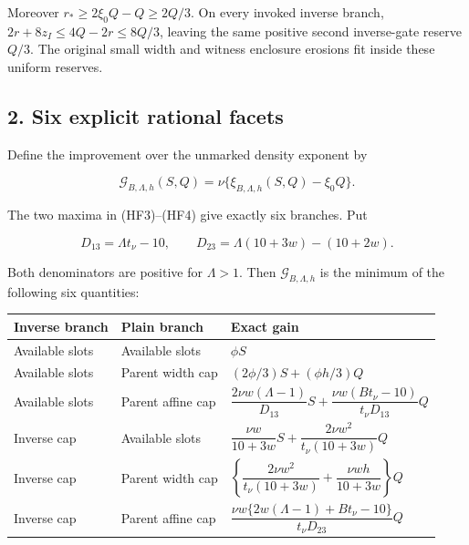 Moreover \(r_*\ge2\xi_0Q-Q\ge2Q/3\). On every invoked inverse branch, \(2r+8z_I\le4Q-2r\le8Q/3\), leaving the same positive second inverse-gate reserve \(Q/3\). The original small width and witness enclosure erosions fit inside these uniform reserves.

\hypertarget{feedback:six-explicit-rational-facets}{%
\subsection{2. Six explicit rational facets}\label{feedback:six-explicit-rational-facets}}

Define the improvement over the unmarked density exponent by

\[
 \mathcal G_{B,\Lambda,h}(S,Q)
   =\nu\{\xi_{B,\Lambda,h}(S,Q)-\xi_0Q\}.
\tag{HF6}
\]

The two maxima in (HF3)--(HF4) give exactly six branches. Put

\[
 D_{13}=\Lambda t_\nu-10,\qquad
 D_{23}=\Lambda(10+3w)-(10+2w).
\]

Both denominators are positive for \(\Lambda>1\). Then \(\mathcal G_{B,\Lambda,h}\) is the minimum of the following six quantities:

\begin{landscape}
\begingroup %
\fontsize{7.5}{9.5}\selectfont\setlength{\tabcolsep}{2pt}\renewcommand{\arraystretch}{1.18}
\begin{longtable}{@{}
 >{\raggedright\arraybackslash}p{35mm}
 >{\raggedright\arraybackslash}p{35mm}
 >{\raggedright\arraybackslash}p{170mm}@{}}
\toprule\noalign{}
Inverse branch & Plain branch & Exact gain \\
\midrule\noalign{}
\endhead
\bottomrule\noalign{}
\endlastfoot
Available slots & Available slots & \(\phi S\) \\
Available slots & Parent width cap & \((2\phi/3)S+(\phi h/3)Q\) \\
Available slots & Parent affine cap & \(\dfrac{2\nu w(\Lambda-1)}{D_{13}}S+\dfrac{\nu w(Bt_\nu-10)}{t_\nu D_{13}}Q\) \\
Inverse cap & Available slots & \(\dfrac{\nu w}{10+3w}S+\dfrac{2\nu w^2}{t_\nu(10+3w)}Q\) \\
Inverse cap & Parent width cap & \(\left\{\dfrac{2\nu w^2}{t_\nu(10+3w)}+\dfrac{\nu wh}{10+3w}\right\}Q\) \\
Inverse cap & Parent affine cap & \(\dfrac{\nu w\{2w(\Lambda-1)+Bt_\nu-10\}}{t_\nu D_{23}}Q\) \\
\end{longtable}
\endgroup
\end{landscape}

